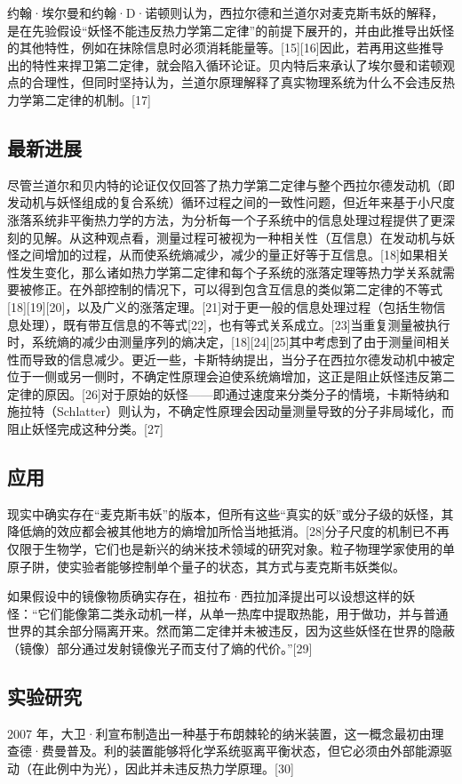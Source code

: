约翰·埃尔曼和约翰·D·诺顿则认为，西拉尔德和兰道尔对麦克斯韦妖的解释，是在先验假设“妖怪不能违反热力学第二定律”的前提下展开的，并由此推导出妖怪的其他特性，例如在抹除信息时必须消耗能量等。[15][16]因此，若再用这些推导出的特性来捍卫第二定律，就会陷入循环论证。贝内特后来承认了埃尔曼和诺顿观点的合理性，但同时坚持认为，兰道尔原理解释了真实物理系统为什么不会违反热力学第二定律的机制。[17]
\subsection{最新进展}
尽管兰道尔和贝内特的论证仅仅回答了热力学第二定律与整个西拉尔德发动机（即发动机与妖怪组成的复合系统）循环过程之间的一致性问题，但近年来基于小尺度涨落系统非平衡热力学的方法，为分析每一个子系统中的信息处理过程提供了更深刻的见解。从这种观点看，测量过程可被视为一种相关性（互信息）在发动机与妖怪之间增加的过程，从而使系统熵减少，减少的量正好等于互信息。[18]如果相关性发生变化，那么诸如热力学第二定律和每个子系统的涨落定理等热力学关系就需要被修正。在外部控制的情况下，可以得到包含互信息的类似第二定律的不等式[18][19][20]，以及广义的涨落定理。[21]对于更一般的信息处理过程（包括生物信息处理），既有带互信息的不等式[22]，也有等式关系成立。[23]当重复测量被执行时，系统熵的减少由测量序列的熵决定，[18][24][25]其中考虑到了由于测量间相关性而导致的信息减少。更近一些，卡斯特纳提出，当分子在西拉尔德发动机中被定位于一侧或另一侧时，不确定性原理会迫使系统熵增加，这正是阻止妖怪违反第二定律的原因。[26]对于原始的妖怪——即通过速度来分类分子的情境，卡斯特纳和施拉特（Schlatter）则认为，不确定性原理会因动量测量导致的分子非局域化，而阻止妖怪完成这种分类。[27]
\subsection{应用}
现实中确实存在“麦克斯韦妖”的版本，但所有这些“真实的妖”或分子级的妖怪，其降低熵的效应都会被其他地方的熵增加所恰当地抵消。[28]分子尺度的机制已不再仅限于生物学，它们也是新兴的纳米技术领域的研究对象。粒子物理学家使用的单原子阱，使实验者能够控制单个量子的状态，其方式与麦克斯韦妖类似。

如果假设中的镜像物质确实存在，祖拉布·西拉加泽提出可以设想这样的妖怪：“它们能像第二类永动机一样，从单一热库中提取热能，用于做功，并与普通世界的其余部分隔离开来。然而第二定律并未被违反，因为这些妖怪在世界的隐蔽（镜像）部分通过发射镜像光子而支付了熵的代价。”[29]
\subsection{实验研究}
2007 年，大卫·利宣布制造出一种基于布朗棘轮的纳米装置，这一概念最初由理查德·费曼普及。利的装置能够将化学系统驱离平衡状态，但它必须由外部能源驱动（在此例中为光），因此并未违反热力学原理。[30]

